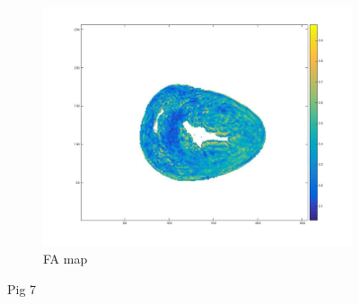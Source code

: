 \begin{figure}
\begin{subfigure}{.31\textwidth}
        \includegraphics[width=\textwidth]{figures/pig7_fa_14}
        \caption{FA map}
        \label{fig:pig7_fa}
    \end{subfigure}
    \caption{Pig 7}
    \label{fig:pig7}
    

\end{figure}

